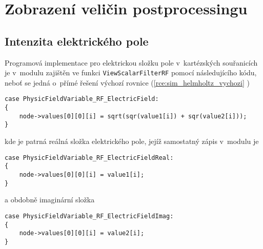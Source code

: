 \section{Zobrazení veličin postprocessingu}
\subsection*{Intenzita elektrického pole}
Programová implementace pro elektrickou složku pole v~kartézských souřanicích je v~modulu zajištěn ve funkci \texttt{ViewScalarFilterRF} pomocí následujícího kódu, neboť se jedná o~přímé řešení výchozí rovnice (\ref{rce:sim_helmholtz_vychozi} )
\begin{verbatim}
case PhysicFieldVariable_RF_ElectricField:
{
    node->values[0][0][i] = sqrt(sqr(value1[i]) + sqr(value2[i]));
}    
\end{verbatim}
kde je patrná reálná složka elektrického pole, jejíž samostatný zápis v~modulu je
\begin{verbatim}
case PhysicFieldVariable_RF_ElectricFieldReal:
{
    node->values[0][0][i] = value1[i];
}    
\end{verbatim}
a obdobně imaginární složka 
\begin{verbatim}
case PhysicFieldVariable_RF_ElectricFieldImag:
{    
    node->values[0][0][i] = value2[i];
}
\end{verbatim}

